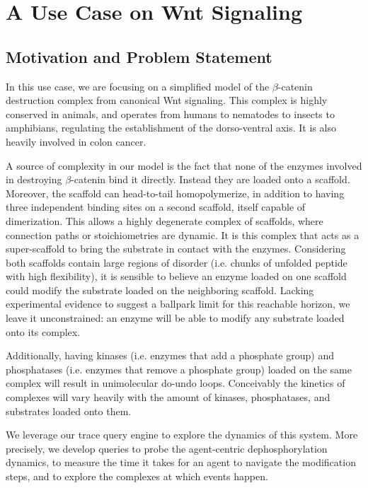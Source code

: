 \section{A Use Case on Wnt Signaling}\label{sec:use-case}


\subsection{Motivation and Problem Statement}

In this use case, we are focusing on a simplified model of the
$\beta$-catenin destruction complex from canonical Wnt signaling. This
complex is highly conserved in animals, and operates from humans to
nematodes to insects to amphibians, regulating the establishment of
the dorso-ventral axis. It is also heavily involved in colon cancer.

A source of complexity in our model is the fact that none of the
enzymes involved in destroying $\beta$-catenin bind it directly.
Instead they are loaded onto a scaffold. Moreover, the scaffold can
head-to-tail homopolymerize, in addition to having three independent
binding sites on a second scaffold, itself capable of dimerization.
This allows a highly degenerate complex of scaffolds, where connection
paths or stoichiometries are dynamic. It is this complex that acts as a
super-scaffold to bring the substrate in contact with the
enzymes. Considering both scaffolds contain large regions of disorder
(i.e. chunks of unfolded peptide with high flexibility), it is
sensible to believe an enzyme loaded on one scaffold could modify the
substrate loaded on the neighboring scaffold. Lacking experimental
evidence to suggest a ballpark limit for this reachable horizon, we
leave it unconstrained: an enzyme will be able to modify any substrate
loaded onto its complex.

Additionally, having kinases (i.e. enzymes that add a phosphate group)
and phosphatases (i.e. enzymes that remove a phosphate group) loaded on
the same complex will result in unimolecular do-undo loops. Conceivably
the kinetics of complexes will vary heavily with the amount of kinases,
phosphatases, and substrates loaded onto them.

We leverage our trace query engine to explore the dynamics of this
system. More precisely, we develop queries to probe the agent-centric
dephosphorylation dynamics, to measure the time it takes for an agent
to navigate the modification steps, and to explore the complexes at
which events happen.


